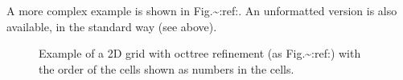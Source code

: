 \documentclass[letterpaper,10pt,english]{sphinxmanual}
\begin{document}
\begin{sphinxVerbatim}[commandchars=\\\{\}]
\PYG{p}{[}\PYG{p}{]}
\PYG{p}{[}\PYG{p}{]}
\PYG{p}{[}\PYG{p}{]}
\PYG{p}{[}\PYG{p}{]}
\PYG{p}{[}\PYG{p}{]}                                  
\end{sphinxVerbatim}

A more complex example is shown in Fig.\textasciitilde{}:ref:.
An unformatted version is also available, in the standard way (see above).

\begin{figure}[htbp]
\centering
\capstart

\noindent{}
\caption{Example of a 2\sphinxhyphen{}D grid with oct\sphinxhyphen{}tree refinement (as
Fig.\textasciitilde{}:ref:) with the order of the cells shown as numbers in
the cells.}\label{\detokenize{inputoutputfiles:id10}}\label{\detokenize{inputoutputfiles:fig-oct-tree-amr-numbered}}\end{figure}
\end{document}
